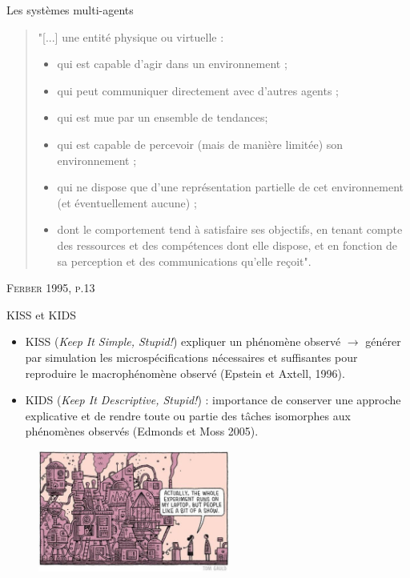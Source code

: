 \documentclass[newPxFont]{beamer}
\begin{document}
\begin{frame}[c]{Les systèmes multi-agents}
  \vspace{-2em}
  \small
  \begin{quote}
    "[...] une entité physique ou virtuelle :
      \begin{itemize}
        \item qui est capable d'agir dans un environnement ;
        \item qui peut communiquer directement avec d'autres agents ;
        \item qui est mue par un ensemble de tendances;
        \item qui est capable de percevoir (mais de manière limitée) son environnement ;
        \item qui ne dispose que d'une représentation partielle de cet environnement (et éventuellement aucune) ;
        \item dont le comportement tend à satisfaire ses objectifs, en tenant compte des ressources et des compétences dont elle dispose, et en fonction de sa perception et des communications qu'elle reçoit".
      \end{itemize}
  \end{quote}
  \hspace*{\fill}\textsc{Ferber 1995, p.13}
\end{frame}

\begin{frame}[c]{KISS et KIDS}
  \vspace{-2em}
  \begin{itemize}
    \item KISS (\textit{Keep It Simple, Stupid!}) expliquer un phénomène observé $\rightarrow$ générer par simulation les microspécifications nécessaires et suffisantes pour reproduire le macrophénomène observé (Epstein et Axtell, 1996).
    \item KIDS (\textit{Keep It Descriptive, Stupid!}) : importance de conserver une approche explicative et de rendre toute ou partie des tâches isomorphes aux phénomènes observés (Edmonds et Moss 2005).
  \end{itemize}
  \vspace{-1em}
  \begin{figure}
   \includegraphics[height=4cm]{img/a_KIDS.jpg}
  \end{figure}
\end{frame}
\end{document}
